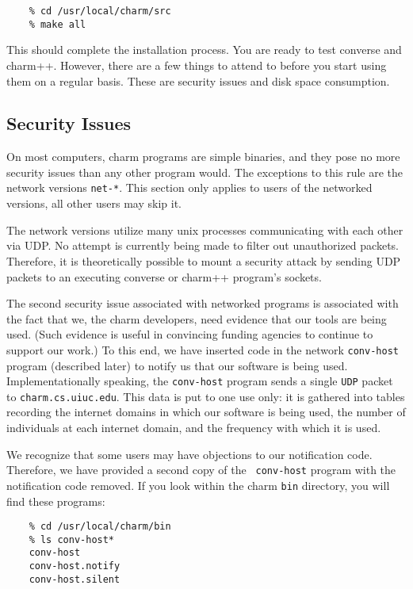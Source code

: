 \begin{verbatim}
    % cd /usr/local/charm/src
    % make all
\end{verbatim}

This should complete the installation process.  You are ready to test
converse and charm++.  However, there are a few things to
attend to before you start using them on a regular basis.  These are
security issues and disk space consumption.

\subsection{Security Issues}

On most computers, charm programs are simple binaries, and they pose
no more security issues than any other program would.  The exceptions
to this rule are the network versions {\tt net-*}.  
This section only applies to users
of the networked versions, all other users may skip it.

The network versions utilize many unix processes communicating with
each other via UDP.  No attempt is currently being made to filter out
unauthorized packets.  Therefore, it is theoretically possible to
mount a security attack by sending UDP packets to an executing
converse or charm++ program's sockets.

The second security issue associated with networked programs is
associated with the fact that we, the charm developers, need evidence
that our tools are being used.  (Such evidence is useful in convincing
funding agencies to continue to support our work.)  To this end, we
have inserted code in the network {\tt conv-host} program (described
later) to notify us that our software is being used.
Implementationally speaking, the {\tt conv-host} program sends a
single {\tt UDP} packet to {\tt charm.cs.uiuc.edu}.  This data is put
to one use only: it is gathered into tables recording the internet
domains in which our software is being used, the number of individuals
at each internet domain, and the frequency with which it is used.

We recognize that some users may have objections to our notification
code.  Therefore, we have provided a second copy of the {\tt
conv-host} program with the notification code removed.  If you look
within the charm {\tt bin} directory, you will find these programs:

\begin{verbatim}
    % cd /usr/local/charm/bin
    % ls conv-host*
    conv-host
    conv-host.notify
    conv-host.silent
\end{verbatim}

